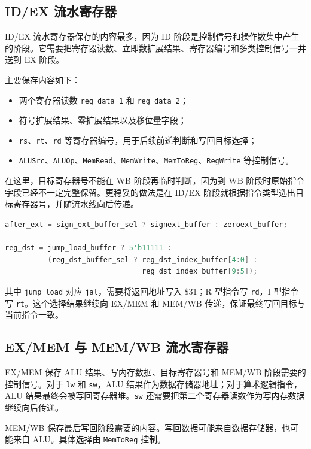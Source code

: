 \documentclass[UTF8,zihao=-4]{ctexart}
\begin{document}
\subsection{ID/EX 流水寄存器}

ID/EX 流水寄存器保存的内容最多，因为 ID 阶段是控制信号和操作数集中产生的阶段。它需要把寄存器读数、立即数扩展结果、寄存器编号和多类控制信号一并送到 EX 阶段。

主要保存内容如下：

\begin{itemize}
  \item 两个寄存器读数 \texttt{reg\_data\_1} 和 \texttt{reg\_data\_2}；
  \item 符号扩展结果、零扩展结果以及移位量字段；
  \item \texttt{rs}、\texttt{rt}、\texttt{rd} 等寄存器编号，用于后续前递判断和写回目标选择；
  \item \texttt{ALUSrc}、\texttt{ALUOp}、\texttt{MemRead}、\texttt{MemWrite}、\texttt{MemToReg}、\texttt{RegWrite} 等控制信号。
\end{itemize}

在这里，目标寄存器号不能在 WB 阶段再临时判断，因为到 WB 阶段时原始指令字段已经不一定完整保留。更稳妥的做法是在 ID/EX 阶段就根据指令类型选出目标寄存器号，并随流水线向后传递。

\begin{lstlisting}[language=Verilog]
after_ext = sign_ext_buffer_sel ? signext_buffer : zeroext_buffer;

reg_dst = jump_load_buffer ? 5'b11111 :
          (reg_dst_buffer_sel ? reg_dst_index_buffer[4:0] :
                                reg_dst_index_buffer[9:5]);
\end{lstlisting}

其中 \texttt{jump\_load} 对应 \texttt{jal}，需要将返回地址写入 \$31；R 型指令写 \texttt{rd}，I 型指令写 \texttt{rt}。这个选择结果继续向 EX/MEM 和 MEM/WB 传递，保证最终写回目标与当前指令一致。

\subsection{EX/MEM 与 MEM/WB 流水寄存器}

EX/MEM 保存 ALU 结果、写内存数据、目标寄存器号和 MEM/WB 阶段需要的控制信号。对于 \texttt{lw} 和 \texttt{sw}，ALU 结果作为数据存储器地址；对于算术逻辑指令，ALU 结果最终会被写回寄存器堆。\texttt{sw} 还需要把第二个寄存器读数作为写内存数据继续向后传递。

MEM/WB 保存最后写回阶段需要的内容。写回数据可能来自数据存储器，也可能来自 ALU。具体选择由 \texttt{MemToReg} 控制。
\end{document}
